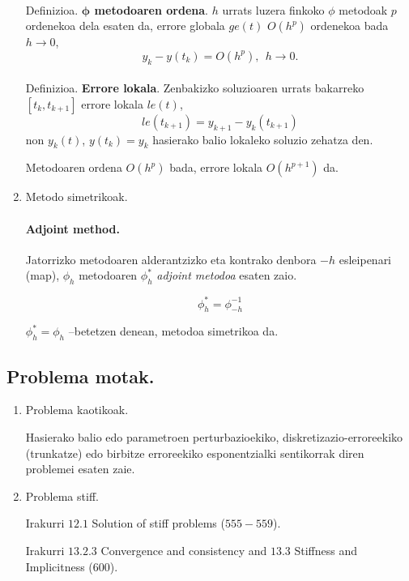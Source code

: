 \begin{enumerate}
\paragraph*{} Definizioa. \textbf{$\mathbf{\phi}$ metodoaren ordena}. $h$ urrats luzera finkoko $\phi$ metodoak $p$ ordenekoa dela esaten da, errore globala $ge(t)$  $O(h^{p})$ ordenekoa bada  $h \rightarrow 0$,
\begin{equation*}
y_k-y(t_k)=O(h^{p}), \ \ h \rightarrow 0.
\end{equation*}   

\paragraph*{}Definizioa. \textbf{Errore lokala}. Zenbakizko soluzioaren urrats bakarreko $[t_k,t_{k+1}]$ errore lokala $le(t)$,
\begin{equation*}
le(t_{k+1})=y_{k+1}-y_k(t_{k+1})
\end{equation*}  
non $y_k(t)$, $y(t_k)=y_k$ hasierako balio lokaleko soluzio zehatza den. 

Metodoaren ordena $O(h^p)$ bada, errore lokala $O(h^{p+1})$ da.

\item  Metodo simetrikoak.

\paragraph*{\textbf{Adjoint method}.} Jatorrizko metodoaren alderantzizko eta kontrako denbora $-h$ esleipenari (map), $\phi_h$ metodoaren $\phi_h^{*}$ \emph{adjoint metodoa} esaten zaio.

\begin{equation*}
\phi_h^{*}=\phi_{-h}^{-1}
\end{equation*}

$\phi_h^{*}=\phi_h$  --betetzen denean, metodoa simetrikoa da. 

\end{enumerate}


\subsection{Problema motak.}

\begin{enumerate}

\item Problema kaotikoak. 

Hasierako balio edo parametroen perturbazioekiko, diskretizazio-erroreekiko (trunkatze) edo birbitze erroreekiko esponentzialki sentikorrak diren problemei esaten zaie.

\item Problema stiff.

Irakurri $12.1$ Solution of stiff problems ($555-559$).

Irakurri $13.2.3$ Convergence and consistency and $13.3$ Stiffness and Implicitness (600).

\end{enumerate}


